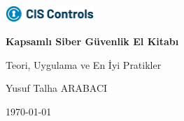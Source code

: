 \documentclass[11pt,a4paper,twoside]{book}
\newcommand{\KitapBaslik}{Kapsamlı Siber Güvenlik El Kitabı}
\newcommand{\KitapAltBaslik}{Teori, Uygulama ve En İyi Pratikler}
\newcommand{\YazarAdi}{Yusuf Talha ARABACI}
\begin{document}
\begin{titlepage}
  \centering
  \vspace*{2cm}
  \includegraphics[width=0.25\textwidth]{img/logo_cis.png} \\
  \vspace{1.5cm}
  {\Huge\bfseries \KitapBaslik \par}
  \vspace{0.5cm}
  {\Large \KitapAltBaslik \par}
  \vfill
  {\Large \YazarAdi \par}
  \vspace{1cm}
  {\large \today \par}
\end{titlepage}

\frontmatter
\tableofcontents
\mainmatter
















\backmatter
\end{document}
